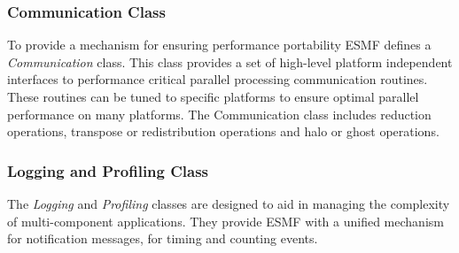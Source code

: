 \subsubsection{Communication Class}
To provide a mechanism for ensuring performance portability ESMF defines a {\it Communication} class. This class provides a set of
high-level platform independent interfaces to performance critical parallel processing communication routines. These routines can be tuned
to specific platforms to ensure optimal parallel performance on many platforms. The Communication class includes reduction
operations, transpose or redistribution operations and halo or ghost operations.

\subsubsection{Logging and Profiling Class}
The {\it Logging} and {\it Profiling} classes are designed to aid in managing the complexity of multi-component applications. They provide
ESMF with a unified mechanism for notification messages, for timing and counting events.





